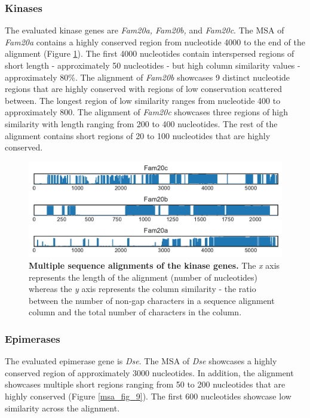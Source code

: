 \documentclass{article}
\begin{document}
\subsubsection{Kinases}
The evaluated kinase genes are \textit{Fam20a, Fam20b,} and \textit{Fam20c}. The MSA of \textit{Fam20a} contains a highly conserved region from nucleotide 4000 to the end of the alignment (Figure \ref{msa_fig_8}). The first 4000 nucleotides contain interspersed regions of short length - approximately 50 nucleotides - but high column similarity values - approximately 80\%. The alignment of \textit{Fam20b} showcases 9 distinct nucleotide regions that are highly conserved with regions of low conservation scattered between. The longest region of low similarity ranges from nucleotide 400 to approximately 800. The alignment of \textit{Fam20c} showcases three regions of high similarity with length ranging from 200 to 400 nucleotides. The rest of the alignment contains short regions of 20 to 100 nucleotides that are highly conserved.

\begin{figure}
\centering
\includegraphics[width=\textwidth]{./images/kinase_msa.pdf}
\caption{\textbf{Multiple sequence alignments of the kinase genes.} The \textit{x} axis represents the length of the alignment (number of nucleotides) whereas the \textit{y} axis represents the column similarity - the ratio between the number of non-gap characters in a sequence alignment column and the total number of characters in the column.}
\label{msa_fig_8}
\end{figure}

\subsubsection{Epimerases}
The evaluated epimerase gene is \textit{Dse}. The MSA of \textit{Dse} showcases a highly conserved region of approximately 3000 nucleotides. In addition, the alignment showcases multiple short regions ranging from 50 to 200 nucleotides that are highly conserved (Figure \ref{msa_fig_9}). The first 600 nucleotides showcase low similarity across the alignment. 
\end{document}
